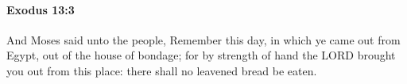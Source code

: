 
		\paragraph{Exodus 13:3} %
			\label{EXODUS-13-3}

			And Moses said unto the people, Remember this day, in which ye came out from Egypt, out of the house of bondage; for by strength of hand the LORD brought you out from this place: there shall no leavened bread be eaten.


